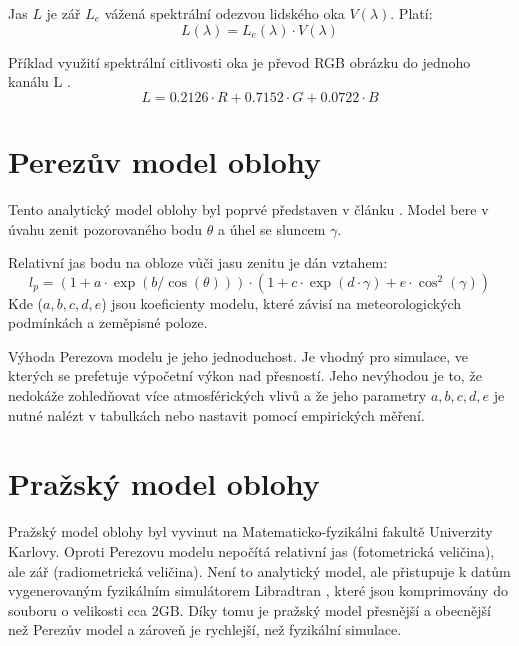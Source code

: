 \begin{definice}
  Jas $L$ je zář $L_e$ vážená spektrální odezvou lidského oka $V(\lambda)$. Platí:
  \begin{equation}
    L(\lambda) = L_e(\lambda) \cdot V(\lambda)
  \end{equation}
\end{definice}

Příklad využití spektrální citlivosti oka je převod RGB obrázku do jednoho kanálu L \citep{rgbgray}.
\begin{equation}
  L = 0.2126 \cdot R + 0.7152 \cdot G + 0.0722 \cdot B 
\end{equation}

\section{Perezův model oblohy}
Tento analytický model oblohy byl poprvé představen v článku \cite{Perez93}.
Model bere v úvahu zenit pozorovaného bodu $\theta$ a úhel se sluncem $\gamma$.

\begin{veta}\label{veta01:1}\citep{Perez93}
Relativní jas bodu na obloze vůči jasu zenitu je dán vztahem:
\begin{equation}\label{eq01:5}
  l_p = (1 + a \cdot \exp(b/\cos(\theta))) \cdot (1 + c \cdot \exp(d \cdot \gamma) + e \cdot \cos^2(\gamma))
\end{equation}
    Kde ($a, b, c, d, e$) jsou koeficienty modelu, které závisí na meteorologických podmínkách a zeměpisné poloze.
\end{veta}

Výhoda Perezova modelu je jeho jednoduchost. Je vhodný pro simulace, ve kterých se prefetuje výpočetní výkon nad přesností. Jeho nevýhodou je to, že nedokáže zohledňovat více atmosférických vlivů a že jeho parametry $a, b, c, d, e$ je nutné nalézt v tabulkách nebo nastavit pomocí empirických měření.

\section{Pražský model oblohy}

Pražský model oblohy \citep{Prague2021} byl vyvinut na Matematicko-fyzikálni fakultě Univerzity Karlovy. 
Oproti Perezovu modelu nepočítá relativní jas (fotometrická veličina), ale zář (radiometrická veličina). 
Není to analytický model, ale přistupuje k datům vygenerovaným fyzikálním simulátorem Libradtran \citep{Libradtran2016}, které jsou komprimovány do souboru o velikosti cca 2GB. 
Díky tomu je pražský model přesnější a obecnější než Perezův model a zároveň je rychlejší, než fyzikální simulace.

